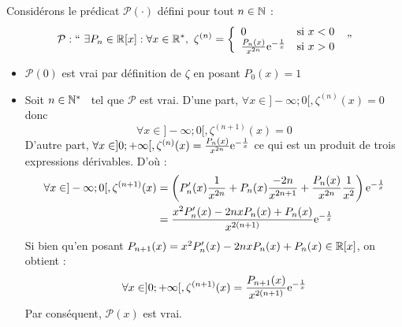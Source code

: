 \documentclass{article}
\renewenvironment{question_kholle}[2][ ]
{
	\subsection{\texorpdfstring{#2}{}}
	\notblank{#1}
	{
		\noindent #1
		\bigbreak
	}
	{}
	\begin{proof}
}
{
	\end{proof}
}
\begin{document}
\begin{question_kholle}
	Considérons le prédicat $\mathcal{P}(\cdot)$ défini pour tout $n \in \mathbb N$ :
	\begin{equation}
		\mathcal{P} : \text{\textquotedblleft} \ \exists P_n \in \R[x] : \forall x \in \R^*, \ \zeta^{(n)} = \left\{ \begin{array}{lc}
			0                                       & \text{si } x < 0 \\
			\frac{P_n(x)}{x^{2n}} \e^{-\frac{1}{x}} & \text{si } x > 0
		\end{array} \right. \ \text{\textquotedblright}
	\end{equation}
	\begin{itemize}[label=$\star$]
		\item $\mathcal{P}(0)$ est vrai par définition de $\zeta$ en posant $P_0(x) = 1$
		\item Soit $n \in \mathbb N^*$ \fq \ tel que $\mathcal{P}$ est vrai.
		      D'une part, $\forall x \in ]-\infty;0[, \zeta^{(n)}(x) = 0$ donc
		      \begin{equation*}
			      \forall x \in ]-\infty;0[, \zeta^{(n+1)}(x) = 0
		      \end{equation*}
		      D'autre part, $\forall x \in ]0;+\infty[, \zeta^{(n)}(x) = \frac{P_n(x)}{x^{2n}} \mathrm e^{-\frac{1}{x}}$ ce qui est un produit de trois expressions dérivables. D'où :
		      \begin{equation*}
			      \begin{aligned}
				      \forall x \in ]-\infty;0[,
				      \zeta^{(n+1)}(x)
				       & = \left( P_n'(x) \frac{1}{x^{2n}} + P_n(x) \frac{-2n}{x^{2n+1}} + \frac{P_n(x)}{x^{2n}} \frac{1}{x^2} \right) \mathrm e^{-\frac{1}{x}} \\
				       & = \frac{x^2 P_n'(x) - 2nxP_n(x) + P_n(x)}{x^{2(n+1)}} \mathrm e^{-\frac{1}{x}}
			      \end{aligned}
		      \end{equation*}
		      Si bien qu'en posant $P_{n+1}(x) = x^2 P_n'(x) - 2 n x P_n(x) + P_n(x) \in \mathbb R[x]$, on obtient :
		      \begin{equation*}
			      \forall x \in ]0;+\infty[, \zeta^{(n+1)}(x) = \frac{P_{n+1}(x)}{x^{2(n+1)}} \mathrm e^{-\frac{1}{x}}
		      \end{equation*}
		      Par conséquent, $\mathcal{P}(x)$ est vrai.


\end{itemize}
\end{question_kholle}
\end{document}
